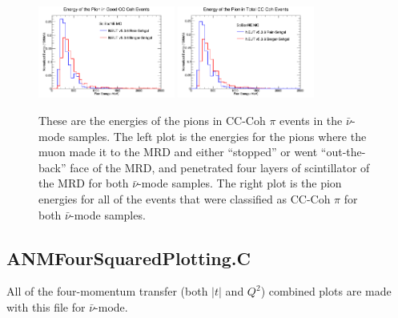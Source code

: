 \documentclass[11pt]{article}
\begin{document}
\begin{figure}[H]
\centering
\includegraphics[width=0.4\textwidth]{ANMPionPlottingImages/9-ANMPionPlotting.png}
\includegraphics[width=0.4\textwidth]{ANMPionPlottingImages/12-ANMPionPlotting.png}
\caption{These are the energies of the pions in CC-Coh $\pi$ events in the $\bar{\nu}$-mode samples. The left plot is the energies for the pions where the muon made it to the MRD and either ``stopped'' or went ``out-the-back'' face of the MRD, and penetrated four layers of scintillator of the MRD for both $\bar{\nu}$-mode samples. The right plot is the pion energies for all of the events that were classified as CC-Coh $\pi$ for both $\bar{\nu}$-mode samples.}
\label{fig:app:ANMPionEnergy}
\end{figure}

\subsection{ANMFourSquaredPlotting.C}
\label{sub:ANMFourSquaredPlotting.C}
All of the four-momentum transfer (both $|t|$ and $Q^2$) combined plots are made with this file for $\bar{\nu}$-mode.
\end{document}

